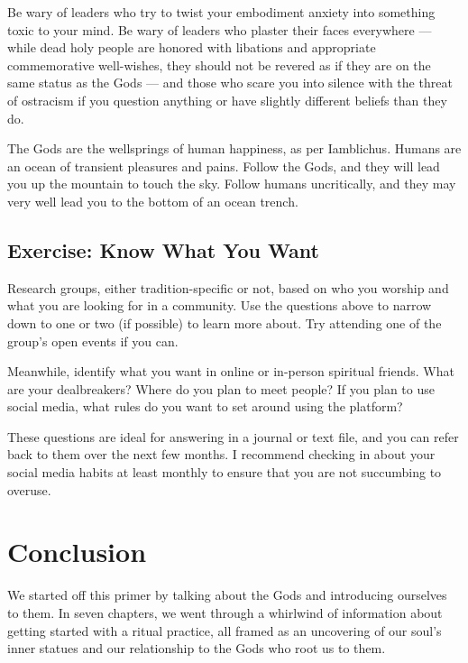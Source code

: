\documentclass[
]{book}
\begin{document}
Be wary of leaders who try to twist your embodiment anxiety into something toxic to your mind. Be wary of leaders who plaster their faces everywhere --- while dead holy people are honored with libations and appropriate commemorative well-wishes, they should not be revered as if they are on the same status as the Gods --- and those who scare you into silence with the threat of ostracism if you question anything or have slightly different beliefs than they do.

The Gods are the wellsprings of human happiness, as per Iamblichus. Humans are an ocean of transient pleasures and pains. Follow the Gods, and they will lead you up the mountain to touch the sky. Follow humans uncritically, and they may very well lead you to the bottom of an ocean trench.

\hypertarget{exercise-know-what-you-want}{%
\section{Exercise: Know What You Want}\label{exercise-know-what-you-want}}

Research groups, either tradition-specific or not, based on who you worship and what you are looking for in a community. Use the questions above to narrow down to one or two (if possible) to learn more about. Try attending one of the group's open events if you can.

Meanwhile, identify what you want in online or in-person spiritual friends. What are your dealbreakers? Where do you plan to meet people? If you plan to use social media, what rules do you want to set around using the platform?

These questions are ideal for answering in a journal or text file, and you can refer back to them over the next few months. I recommend checking in about your social media habits at least monthly to ensure that you are not succumbing to overuse.

\hypertarget{conclusion}{%
\chapter{Conclusion}\label{conclusion}}

We started off this primer by talking about the Gods and introducing ourselves to them. In seven chapters, we went through a whirlwind of information about getting started with a ritual practice, all framed as an uncovering of our soul's inner statues and our relationship to the Gods who root us to them.
\end{document}
